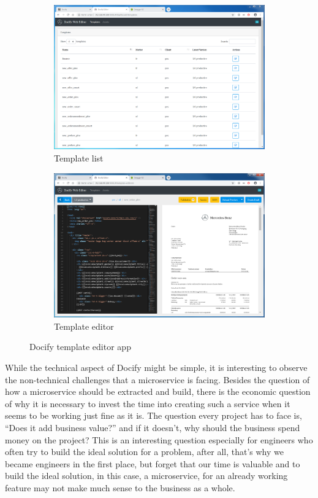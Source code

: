 \begin{figure}
  \begin{subfigure}[b]{0.5\linewidth}
    \includegraphics[width=\linewidth]{assets/docify-template-list.png}
    \caption{Template list}
    \label{fig:docify:a}
  \end{subfigure}
  \begin{subfigure}[b]{0.5\linewidth}
    \includegraphics[width=\linewidth]{assets/docify-editor.png}
    \caption{Template editor}
    \label{fig:docify:b}
  \end{subfigure}
  \caption{Docify template editor app}
  \label{fig:docify}
\end{figure}

While the technical aspect of Docify might be simple, it is interesting to observe the non-technical challenges that a microservice is facing. Besides the question of how a microservice should be extracted and build, there is the economic question of why it is necessary to invest the time into creating such a service when it seems to be working just fine as it is. The question every project has to face is, ``Does it add business value?'' and if it doesn't, why should the business spend money on the project? This is an interesting question especially for engineers who often try to build the ideal solution for a problem, after all, that's why we became engineers in the first place, but forget that our time is valuable and to build the ideal solution, in this case, a microservice, for an already working feature may not make much sense to the business as a whole.

